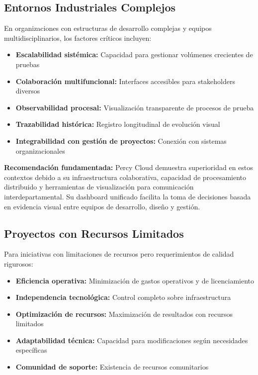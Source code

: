\documentclass{article}
\begin{document}
\subsection{Entornos Industriales Complejos}

En organizaciones con estructuras de desarrollo complejas y equipos multidisciplinarios, los factores críticos incluyen:

\begin{itemize}[nosep]
\item \textbf{Escalabilidad sistémica:} Capacidad para gestionar volúmenes crecientes de pruebas
\item \textbf{Colaboración multifuncional:} Interfaces accesibles para stakeholders diversos
\item \textbf{Observabilidad procesal:} Visualización transparente de procesos de prueba
\item \textbf{Trazabilidad histórica:} Registro longitudinal de evolución visual
\item \textbf{Integrabilidad con gestión de proyectos:} Conexión con sistemas organizacionales
\end{itemize}

\textbf{Recomendación fundamentada:} Percy Cloud demuestra superioridad en estos contextos debido a su infraestructura colaborativa, capacidad de procesamiento distribuido y herramientas de visualización para comunicación interdepartamental. Su dashboard unificado facilita la toma de decisiones basada en evidencia visual entre equipos de desarrollo, diseño y gestión.

\subsection{Proyectos con Recursos Limitados}

Para iniciativas con limitaciones de recursos pero requerimientos de calidad rigurosos:

\begin{itemize}[nosep]
\item \textbf{Eficiencia operativa:} Minimización de gastos operativos y de licenciamiento
\item \textbf{Independencia tecnológica:} Control completo sobre infraestructura
\item \textbf{Optimización de recursos:} Maximización de resultados con recursos limitados
\item \textbf{Adaptabilidad técnica:} Capacidad para modificaciones según necesidades específicas
\item \textbf{Comunidad de soporte:} Existencia de recursos comunitarios
\end{itemize}
\end{document}
